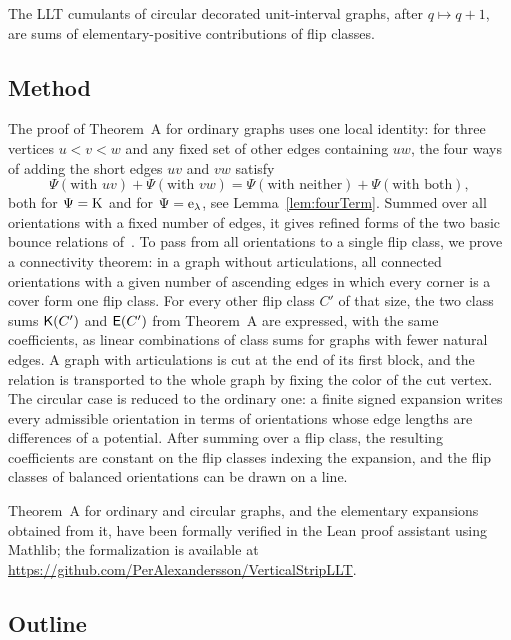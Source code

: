 \begin{corollaryC}
The LLT cumulants of circular decorated unit-interval graphs, after
$q\mapsto q+1$, are sums of elementary-positive contributions of flip classes.
\end{corollaryC}

\subsection*{Method}

The proof of Theorem~A for ordinary graphs uses one local identity: for three
vertices $u<v<w$ and any fixed set of other edges containing $uw$, the four ways
of adding the short edges $uv$ and $vw$ satisfy
\[
 \Psi(\text{with } uv)+\Psi(\text{with } vw)=\Psi(\text{with neither})+\Psi(\text{with both}),
\]
both for $\Psi=\mathrm{K}$ and for $\Psi=\mathrm{e}_\lambda$, see Lemma~\ref{lem:fourTerm}.
Summed over all orientations with a fixed number of edges, it gives refined
forms of the two basic bounce relations of~\cite{AlexanderssonSulzgruber2022}.
To pass from all orientations to a single flip class, we prove a connectivity
theorem: in a graph without articulations, all connected orientations with a
given number of ascending edges in which every corner is a cover form one flip
class.
For every other flip class $C'$ of that size, the two class sums $\mathsf{K}(C')$ and
$\mathsf{E}(C')$ from Theorem~A are expressed, with the same coefficients, as linear
combinations of class sums for graphs with fewer natural edges.
A graph with articulations is cut at the end of its first block, and the
relation is transported to the whole graph by fixing the color of the cut vertex.
The circular case is reduced to the ordinary one: a finite signed expansion
writes every admissible orientation in terms of orientations whose edge lengths
are differences of a potential.  After summing over a flip class, the resulting
coefficients are constant on the flip classes indexing the expansion, and the
flip classes of balanced orientations can be drawn on a line.

Theorem~A for ordinary and circular graphs, and the elementary expansions
obtained from it, have been formally verified in the Lean proof assistant using
Mathlib; the formalization is available at
\url{https://github.com/PerAlexandersson/VerticalStripLLT}.

\subsection*{Outline}

